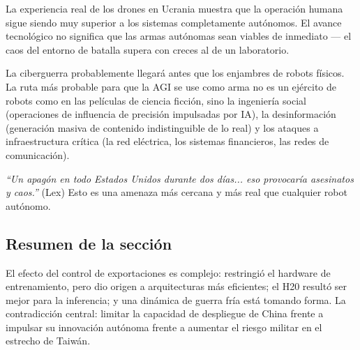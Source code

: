La experiencia real de los drones en Ucrania muestra que la operación humana sigue siendo muy superior a los sistemas completamente autónomos. El avance tecnológico no significa que las armas autónomas sean viables de inmediato — el caos del entorno de batalla supera con creces al de un laboratorio.

La ciberguerra probablemente llegará antes que los enjambres de robots físicos. La ruta más probable para que la AGI se use como arma no es un ejército de robots como en las películas de ciencia ficción, sino la ingeniería social (operaciones de influencia de precisión impulsadas por IA), la desinformación (generación masiva de contenido indistinguible de lo real) y los ataques a infraestructura crítica (la red eléctrica, los sistemas financieros, las redes de comunicación).

\textit{``Un apagón en todo Estados Unidos durante dos días... eso provocaría asesinatos y caos.''} (Lex) Esto es una amenaza más cercana y más real que cualquier robot autónomo.

\subsection{Resumen de la sección}

El efecto del control de exportaciones es complejo: restringió el hardware de entrenamiento, pero dio origen a arquitecturas más eficientes; el H20 resultó ser mejor para la inferencia; y una dinámica de guerra fría está tomando forma. La contradicción central: limitar la capacidad de despliegue de China frente a impulsar su innovación autónoma frente a aumentar el riesgo militar en el estrecho de Taiwán.

